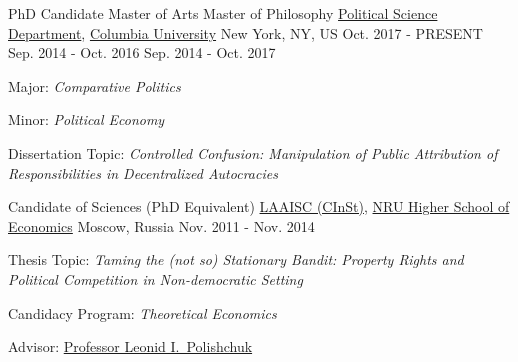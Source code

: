 

\begin{cventries}

\cventry
    {PhD Candidate \newline Master of Arts \newline Master of Philosophy} %
    {\href{http://polisci.columbia.edu/}{Political Science Department}, \href{http://www.columbia.edu/}{Columbia University}} %
    {New York, NY, US} %
    {Oct. 2017 - PRESENT \newline Sep. 2014 - Oct. 2016 \newline Sep. 2014 - Oct. 2017} %
    {
      \begin{cvitems} %
        \item {Major: \emph{Comparative Politics}}
        \item {Minor: \emph{Political Economy}}
        \item {Dissertation Topic: \emph{Controlled Confusion: Manipulation of Public Attribution of Responsibilities in Decentralized Autocracies}}
      \end{cvitems}
    }

\cventry
    {Candidate of Sciences (PhD Equivalent)} %
    {\href{http://isc.hse.ru/about_eng}{LAAISC (CInSt)}, \href{http://www.hse.ru/en/}{NRU Higher School of Economics}} %
    {Moscow, Russia} %
    {Nov. 2011 - Nov. 2014} %
    {
      \begin{cvitems} %
        \item {Thesis Topic: \emph{Taming the (not so) Stationary Bandit: Property Rights and Political Competition in Non-democratic Setting}}
        \item {Candidacy Program: \emph{Theoretical Economics}}
        \item {Advisor: \href{http://www.hse.ru/en/org/persons/65104}{Professor Leonid I.~Polishchuk}}
      \end{cvitems}
    }


\end{cventries}

